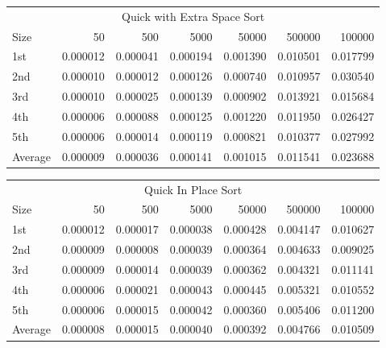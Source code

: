 \documentclass{article}
\begin{document}
\begin{table}[htbp]
  \centering
    \begin{tabular}{lrrrrrr}
    \multicolumn{7}{c}{Quick with Extra Space Sort} \\
    Size  & 50    & 500   & 5000  & 50000  & 500000  & 100000  \\ \hline
    1st   & 0.000012  & 0.000041  & 0.000194  & 0.001390  & 0.010501  & 0.017799  \\
    2nd   & 0.000010  & 0.000012  & 0.000126  & 0.000740  & 0.010957  & 0.030540  \\
    3rd   & 0.000010  & 0.000025  & 0.000139  & 0.000902  & 0.013921  & 0.015684  \\
    4th   & 0.000006  & 0.000088  & 0.000125  & 0.001220  & 0.011950  & 0.026427  \\
    5th   & 0.000006  & 0.000014  & 0.000119  & 0.000821  & 0.010377  & 0.027992  \\
    Average & 0.000009  & 0.000036  & 0.000141  & 0.001015  & 0.011541  & 0.023688  \\
    \end{tabular}%
  \label{tab:addlabel}%
\end{table}%


\begin{table}[htbp]
  \centering
    \begin{tabular}{lrrrrrr}
    \multicolumn{7}{c}{Quick In Place Sort} \\
    Size  & 50    & 500   & 5000  & 50000  & 500000  & 100000  \\ \hline
    1st   & 0.000012  & 0.000017  & 0.000038  & 0.000428  & 0.004147  & 0.010627  \\
    2nd   & 0.000009  & 0.000008  & 0.000039  & 0.000364  & 0.004633  & 0.009025  \\
    3rd   & 0.000009  & 0.000014  & 0.000039  & 0.000362  & 0.004321  & 0.011141  \\
    4th   & 0.000006  & 0.000021  & 0.000043  & 0.000445  & 0.005321  & 0.010552  \\
    5th   & 0.000006  & 0.000015  & 0.000042  & 0.000360  & 0.005406  & 0.011200  \\
    Average & 0.000008  & 0.000015  & 0.000040  & 0.000392  & 0.004766  & 0.010509  \\
    \end{tabular}%
  \label{tab:addlabel}%
\end{table}%
\end{document}
